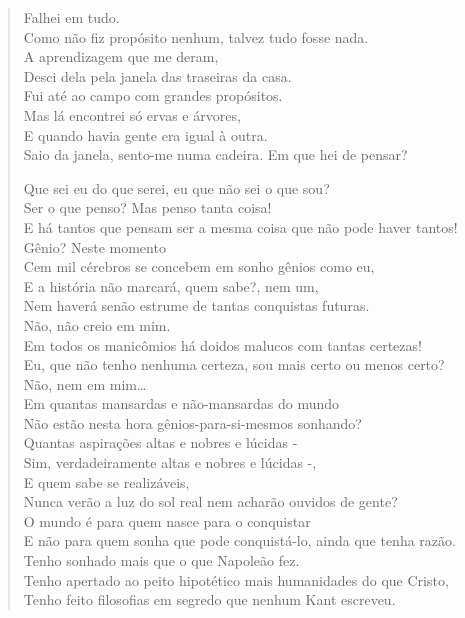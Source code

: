 \documentclass[10pt,a5paper,oneside]{book}
\begin{document}
\begin{verse}
Falhei em tudo.\\
Como não fiz propósito nenhum, talvez tudo fosse nada.\\
A aprendizagem que me deram,\\
Desci dela pela janela das traseiras da casa.\\
Fui até ao campo com grandes propósitos.\\
Mas lá encontrei só ervas e árvores,\\
E quando havia gente era igual à outra.\\
Saio da janela, sento-me numa cadeira. Em que hei de pensar?

Que sei eu do que serei, eu que não sei o que sou?\\
Ser o que penso? Mas penso tanta coisa!\\
E há tantos que pensam ser a mesma coisa que não pode haver tantos!\\
Gênio? Neste momento\\
Cem mil cérebros se concebem em sonho gênios como eu,\\
E a história não marcará, quem sabe?, nem um,\\
Nem haverá senão estrume de tantas conquistas futuras.\\
Não, não creio em mim.\\
Em todos os manicômios há doidos malucos com tantas certezas!\\
Eu, que não tenho nenhuma certeza, sou mais certo ou menos certo?\\
Não, nem em mim\ldots{}\\
Em quantas mansardas e não-mansardas do mundo\\
Não estão nesta hora gênios-para-si-mesmos sonhando?\\
Quantas aspirações altas e nobres e lúcidas -\\
Sim, verdadeiramente altas e nobres e lúcidas -,\\
E quem sabe se realizáveis,\\
Nunca verão a luz do sol real nem acharão ouvidos de gente?\\
O mundo é para quem nasce para o conquistar\\
E não para quem sonha que pode conquistá-lo, ainda que tenha razão.\\
Tenho sonhado mais que o que Napoleão fez.\\
Tenho apertado ao peito hipotético mais humanidades do que Cristo,\\
Tenho feito filosofias em segredo que nenhum Kant escreveu.\\

\end{verse}
\end{document}
